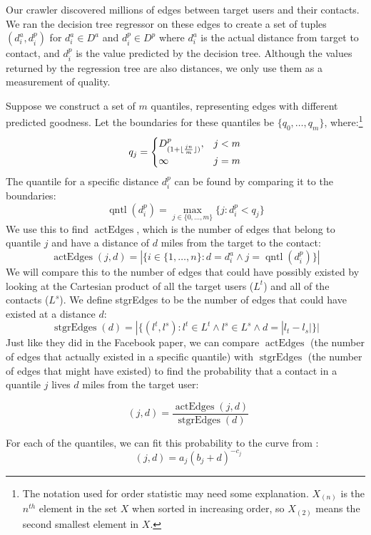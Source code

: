 \documentclass{sig-alternate}
\DeclareMathOperator{\pContact}{p^\ast}
\DeclareMathOperator{\stgrEdges}{stgrEdges}
\DeclareMathOperator{\actEdges}{actEdges}
\DeclareMathOperator{\quantile}{qntl}
\begin{document}
Our crawler discovered millions of edges between target users and their
contacts.
%
We ran the decision tree regressor on these edges to create a set of
tuples $(d^a_i, d^p_i)$ for $d^a_i \in D^a$ and $d^p_i \in D^p$ where
$d^a_i$ is the actual distance from target to contact, and $d^p_i$ is the value
predicted by the decision tree.
%
Although the values returned by the regression tree are also distances,
we only use them as a measurement of quality.

Suppose we construct a set of $m$ quantiles, representing edges with different
predicted goodness.
%
Let the boundaries for these quantiles be $\{q_0,\dots,q_m\}$,
where:\footnote{The notation used for order statistic may need some
    explanation.  $X_{(n)}$ is the $n^{th}$ element in the set $X$ when sorted
    in increasing order, so $X_{(2)}$ means the second smallest element in
$X$.}
\[
    q_j =
    \begin{cases}
        D^p_{(1+\lfloor {jn\over m} \rfloor)}, & j<m \\
        \infty & j=m
    \end{cases}
\]
\noindent The quantile for a specific distance $d^p_i$ can be found by
comparing it to the boundaries:
\[
    \quantile(d^p_i) = \max_{j \in \{0,\dots,m\}} \{j: d^p_i<q_j\}
\]
\noindent We use this to find $\actEdges$, which is the number of edges that belong to
quantile $j$ and have a distance of $d$ miles from the target to the contact:
\[
    \actEdges(j,d) = |\{
            i \in \{1,\dots,n\} :
            d=d^a_i \wedge j=\quantile(d^p_i)
        \}|
\]
\noindent We will compare this to the number of edges that could have possibly
existed by looking at the Cartesian product of all the target users ($L^t$) and all
of the contacts ($L^s$).
%
We define stgrEdges to be the number of edges that could have existed at a
distance $d$:
\[
    \stgrEdges(d) = |\{
            (l^t,l^s):
            l^t \in L^t \wedge l^s \in L^s \wedge d=|l_t-l_s|
        \}|
\]
\noindent Just like they did in the Facebook paper, we can compare $\actEdges$ (the
number of edges that actually existed in a specific quantile) with $\stgrEdges$
(the number of edges that might have existed) to find the probability that
a contact in a quantile $j$ lives $d$ miles from the target user:

\[
\pContact(j,d) = \frac{\actEdges(j,d)}{\stgrEdges(d)}
\]

For each of the quantiles, we can fit this probability to the curve from
\cite{backstrom2010find}:
\[
    \pContact(j,d) = a_{j} (b_{j}+d)^{-c_{j}}
\]
\end{document}
